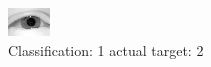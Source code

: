 \begin{figure}[h!]
\begin{center}
\includegraphics[width=0.60\columnwidth]{figures/ID2298_class_1_target_2.png}
\end{center}
\caption{ Classification: 1 actual target: 2}
\label{fig:ID2298_class_1_target_2}
\end{figure}
